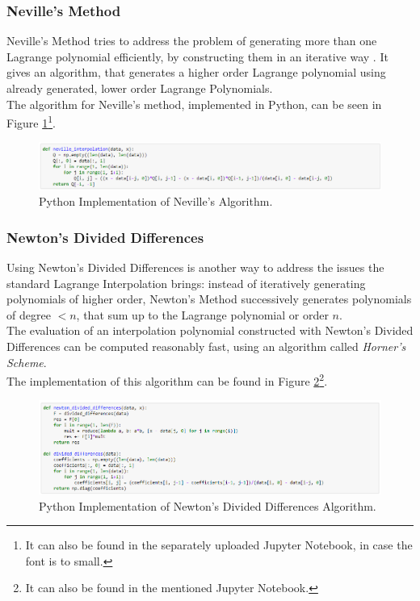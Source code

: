\documentclass[a4paper,11pt, notitlepage]{article}
\begin{document}
\begin{onehalfspace}
\subsubsection{Neville's Method}
\label{subsubsec:Neville}
Neville's Method tries to address the problem of generating more than one Lagrange polynomial efficiently, by constructing them in an iterative way \cite{burden1985numerical}. It gives an algorithm, that generates a higher order Lagrange polynomial using already generated, lower order Lagrange Polynomials.\\
The algorithm for Neville's method, implemented in Python, can be seen in Figure \ref{fig:longbottom}\footnote{It can also be found in the separately uploaded Jupyter Notebook, in case the font is to small.}.

\begin{figure}[H]
	\centering
	\includegraphics[width=\textwidth]{./images/neville-alg.png}
	\caption{Python Implementation of Neville's Algorithm.}
	\label{fig:longbottom}
\end{figure}


\subsubsection{Newton's Divided Differences}
\label{subsubsec:Newton}
Using Newton's Divided Differences is another way to address the issues the standard Lagrange Interpolation brings: instead of iteratively generating polynomials of higher order, Newton's Method successively generates polynomials of degree $<n$, that sum up to the Lagrange polynomial or order $n$. \\
The evaluation of an interpolation polynomial constructed with Newton's Divided Differences can be computed reasonably fast, using an algorithm called \emph{Horner's Scheme}.\\
The implementation of this algorithm can be found in Figure \ref{fig:newton}\footnote{It can also be found in the mentioned Jupyter Notebook.}.

\begin{figure}[H]
	\centering
	\includegraphics[width=\textwidth]{./images/newton-alg.png}
	\caption{Python Implementation of Newton's Divided Differences Algorithm.}
	\label{fig:newton}
\end{figure}


\end{onehalfspace}
\end{document}
